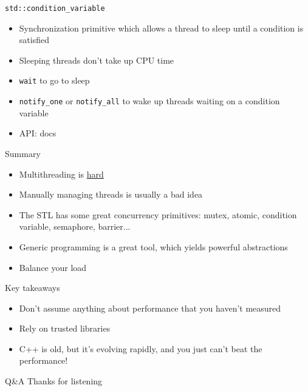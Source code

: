 \documentclass{beamer}
\begin{document}
\begin{frame}{\texttt{std::condition\_variable}}
\begin{itemize}
\item Synchronization primitive which allows a thread to sleep until a condition is satisfied
\item Sleeping threads don't take up CPU time
\item \texttt{wait} to go to sleep
\item \texttt{notify\_one} or \texttt{notify\_all} to wake up threads waiting on a condition variable
\item API: docs
\end{itemize}
\end{frame}

\begin{frame}{Summary}
\begin{itemize}
\setlength\itemsep{.5em}
\item Multithreading is \underline{hard}
\item Manually managing threads is usually a bad idea
\item The STL has some great concurrency primitives: mutex, atomic, condition variable, semaphore, barrier...
\item Generic programming is a great tool, which yields powerful abstractions
\item Balance your load
\end{itemize}
\end{frame}

\begin{frame}{Key takeaways}
\Large
\begin{itemize}
\setlength\itemsep{1em}
\item[\rightarrow] Don't assume anything about performance that you haven't measured
\item[\rightarrow] Rely on trusted libraries
\item[\rightarrow] C++ is old, but it's evolving rapidly, and you just can't beat the performance!
\end{itemize}
\end{frame}

\appendix
\begin{frame}{Q\&A}
\LARGE
Thanks for listening
\end{frame}
\end{document}

